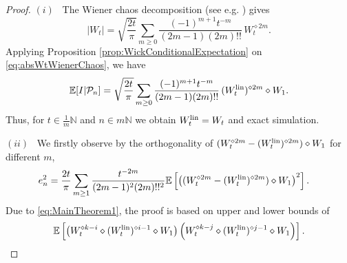 \documentclass[a4paper,11pt,reqno]{amsart}
\theoremstyle{plain}
\def\N{\mathbb{N}}
\def\ex{\mathbb{E}}
\def\lin{{\rm lin}}
\numberwithin{equation}{section}
\begin{document}
\begin{proof}
 $(i)$ \ The Wiener chaos decomposition (see e.g. \cite[p. 65]{Kuo}) gives
\begin{equation}\label{eq:absWtWienerChaos}
|W_t| =  \sqrt{\frac{2t}{\pi}} \sum\limits_{m \geq 0} \frac{(-1)^{m+1} t^{-m}}{(2m-1) (2m)!!}\, W_t^{\diamond 2m}.
\end{equation}
Applying Proposition \ref{prop:WickConditionalExpectation} on \eqref{eq:absWtWienerChaos}, we have
\begin{equation}\label{eq:absWtWienerChaosApprox}
\ex[I|\mathcal{P}_n] = \sqrt{\frac{2t}{\pi}} \sum\limits_{m \geq 0} \frac{(-1)^{m+1} t^{-m}}{(2m-1) (2m)!!}\, (W_t^{\lin})^{\diamond 2m} \diamond W_1.
\end{equation}
Thus, for $t \in \frac{1}{m}\N$ and $n \in m\N$ we obtain $W^{\lin}_t=W_t$ and exact simulation. 

$(ii)$ \ We firstly observe by the orthogonality of $(W_t^{\diamond 2m} -(W_{t}^{\lin})^{\diamond 2m})\diamond W_1$ for different $m$,
\begin{align}
e_n^2 &= \frac{2t}{\pi} \sum\limits_{m \geq 1} \frac{ t^{-2m}}{(2m-1)^2 (2m)!!^2}\ex\left[\left((W_t^{\diamond 2m} -(W_{t}^{\lin})^{\diamond 2m})\diamond W_1\right)^2\right].
\label{eq:OptApproxAbsValue1}
\end{align}
Due to \eqref{eq:MainTheorem1}, the proof is based on upper and lower bounds of 
\[
\ex\left[\left(W_t^{\diamond k-i} \diamond (W_{t}^{\lin})^{\diamond i-1} \diamond W_1\right) \left(W_t^{\diamond k-j} \diamond (W_{t}^{\lin})^{\diamond j-1} \diamond W_1\right)\right]. 
\]


\end{proof}
\end{document}
